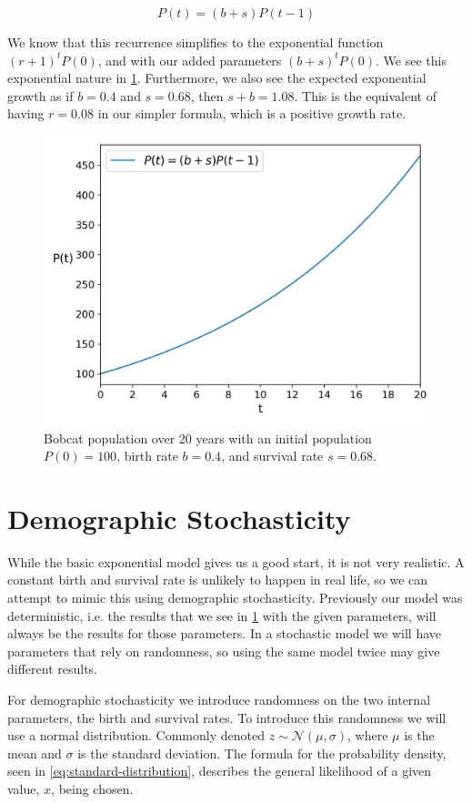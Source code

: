 \documentclass{article}
\begin{document}
\begin{equation} \label{eq:exponential}
    P(t) = (b+s)P(t-1)
\end{equation}

We know that this recurrence simplifies to the exponential function $(r + 1)^tP(0)$, and with our added parameters $(b + s)^tP(0)$. We see this exponential nature in \cref{fig:exponential}. Furthermore, we also see the expected exponential growth as if $b=0.4$ and $s=0.68$, then $s+b = 1.08$. This is the equivalent of having $r = 0.08$ in our simpler formula, which is a positive growth rate.

\begin{figure}
    \centering
    \includegraphics[width=.5\linewidth]{plots/exponential.png}
    \caption{Bobcat population over 20 years with an initial population $P(0)=100$, birth rate $b=0.4$, and survival rate $s=0.68$.}
    \label{fig:exponential}
\end{figure}

\section{Demographic Stochasticity}
While the basic exponential model gives us a good start, it is not very realistic. A constant birth and survival rate is unlikely to happen in real life, so we can attempt to mimic this using demographic stochasticity. Previously our model was deterministic, i.e. the results that we see in \cref{fig:exponential} with the given parameters, will always be the results for those parameters. In a stochastic model we will have parameters that rely on randomness, so using the same model twice may give different results.

For demographic stochasticity we introduce randomness on the two internal parameters, the birth and survival rates. To introduce this randomness we will use a normal distribution. Commonly denoted $z \sim \mathcal{N}(\mu, \sigma)$, where $\mu$ is the mean and $\sigma$ is the standard deviation. The formula for the probability density, seen in \cref{eq:standard-distribution}, describes the general likelihood of a given value, $x$, being chosen.
\end{document}
